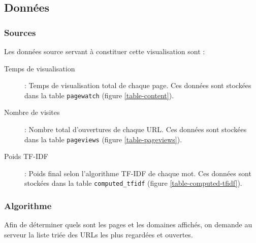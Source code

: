 	\subsection{Données}

		\subsubsection{Sources}

			Les données source servant à constituer cette visualisation sont :
			\begin{description}
				\item[Temps de visualisation] : Temps de visualisation total de chaque page. Ces données sont stockées dans la table \texttt{pagewatch} (figure \ref{table-content}).
				\item[Nombre de visites] : Nombre total d'ouvertures de chaque URL. Ces données sont stockées dans la table \texttt{pageviews} (figure \ref{table-pageviews}).
				\item[Poids TF-IDF] : Poids final selon l'algorithme TF-IDF de chaque mot. Ces données sont stockées dans la table \texttt{computed\_tfidf} (figure \ref{table-computed-tfidf}).
			\end{description}

		\subsubsection{Algorithme}

		Afin de déterminer quels sont les pages et les domaines affichés, on demande au serveur la liste triée des URLs les plus regardées et ouvertes.

